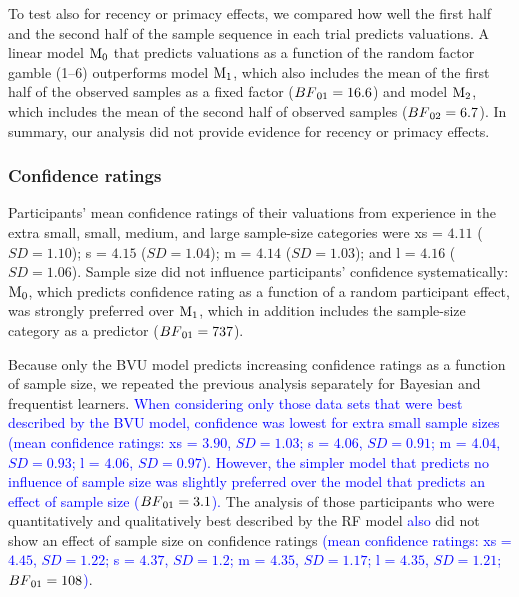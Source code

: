 \documentclass[a4paper, man, natbib, floatsintext]{apa6} %
\begin{document}
To test also for recency or primacy effects, we compared how well the first half and the second half of the sample sequence in each trial predicts valuations. A linear model $\mathrm{M}\textsubscript{0}$ that predicts valuations as a function of the random factor gamble (1--6) outperforms model $\mathrm{M}\textsubscript{1}$, which also includes the mean of the first half of the observed samples as a fixed factor ($BF\textsubscript{01} = 16.6$) and model $\mathrm{M}\textsubscript{2}$, which includes the mean of the second half of observed samples ($BF\textsubscript{02} = 6.7$). In summary, our analysis did not provide evidence for recency or primacy effects.

\subsubsection{Confidence ratings}
Participants' mean confidence ratings of their valuations from experience in the extra small, small, medium, and large sample-size categories were xs = $4.11$ ($SD = 1.10$); s = $4.15$ ($SD = 1.04$); m = $4.14$ ($SD = 1.03$); and l = $4.16$ ($SD = 1.06$). Sample size did not influence participants' confidence systematically: $\mathrm{M}\textsubscript{0}$, which predicts confidence rating as a function of a random participant effect, was strongly preferred over $\mathrm{M}\textsubscript{1}$, which in addition includes the sample-size category as a predictor ($BF\textsubscript{01} = 737$).

Because only the BVU model predicts increasing confidence ratings as a function of sample size, we repeated the previous analysis separately for Bayesian and frequentist learners.
\textcolor{blue}{When considering only those data sets that were best described by the BVU model, confidence was lowest for extra small sample sizes (mean confidence ratings: xs = $3.90$, $SD = 1.03$; s = $4.06$, $SD = 0.91$; m = $4.04$, $SD = 0.93$; l = $4.06$, $SD = 0.97$). However, the simpler model that predicts no influence of sample size was slightly preferred over the model that predicts an effect of sample size ($BF\textsubscript{01} = 3.1$).}
The analysis of those participants who were quantitatively and qualitatively best described by the RF model \textcolor{blue}{also} did not show an effect of sample size on confidence ratings \textcolor{blue}{(mean confidence ratings: xs = $4.45$, $SD = 1.22$; s = $4.37$, $SD = 1.2$; m = $4.35$, $SD = 1.17$; l = $4.35$, $SD = 1.21$; $BF\textsubscript{01} = 108$)}.
\end{document}
